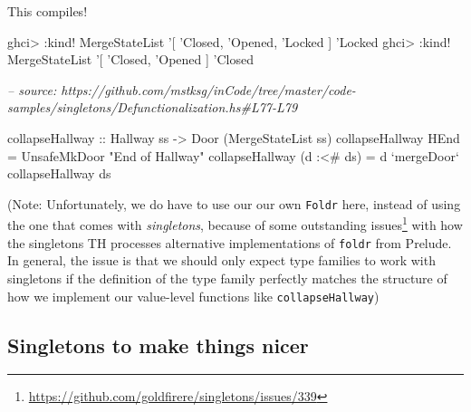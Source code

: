 \documentclass[]{article}
\newenvironment{Shaded}{}{}
\newcommand{\CommentTok}[1]{\textcolor[rgb]{0.38,0.63,0.69}{\textit{#1}}}
\newcommand{\DataTypeTok}[1]{\textcolor[rgb]{0.56,0.13,0.00}{#1}}
\newcommand{\FunctionTok}[1]{\textcolor[rgb]{0.02,0.16,0.49}{#1}}
\newcommand{\NormalTok}[1]{#1}
\newcommand{\OtherTok}[1]{\textcolor[rgb]{0.00,0.44,0.13}{#1}}
\newcommand{\StringTok}[1]{\textcolor[rgb]{0.25,0.44,0.63}{#1}}
\renewcommand{\href}[2]{#2\footnote{\url{#1}}}
\begin{document}
This compiles!

\begin{Shaded}
\begin{Highlighting}[]
\NormalTok{ghci}\FunctionTok{>} \FunctionTok{:}\NormalTok{kind}\FunctionTok{!} \DataTypeTok{MergeStateList}\NormalTok{ '[ '}\DataTypeTok{Closed}\NormalTok{, '}\DataTypeTok{Opened}\NormalTok{, '}\DataTypeTok{Locked}\NormalTok{ ]}
\NormalTok{'}\DataTypeTok{Locked}
\NormalTok{ghci}\FunctionTok{>} \FunctionTok{:}\NormalTok{kind}\FunctionTok{!} \DataTypeTok{MergeStateList}\NormalTok{ '[ '}\DataTypeTok{Closed}\NormalTok{, '}\DataTypeTok{Opened}\NormalTok{ ]}
\NormalTok{'}\DataTypeTok{Closed}
\end{Highlighting}
\end{Shaded}

\begin{Shaded}
\begin{Highlighting}[]
\CommentTok{-- source: https://github.com/mstksg/inCode/tree/master/code-samples/singletons/Defunctionalization.hs#L77-L79}

\OtherTok{collapseHallway ::} \DataTypeTok{Hallway}\NormalTok{ ss }\OtherTok{->} \DataTypeTok{Door}\NormalTok{ (}\DataTypeTok{MergeStateList}\NormalTok{ ss)}
\NormalTok{collapseHallway }\DataTypeTok{HEnd}       \FunctionTok{=} \DataTypeTok{UnsafeMkDoor} \StringTok{"End of Hallway"}
\NormalTok{collapseHallway (d }\FunctionTok{:<#}\NormalTok{ ds) }\FunctionTok{=}\NormalTok{ d }\OtherTok{`mergeDoor`}\NormalTok{ collapseHallway ds}
\end{Highlighting}
\end{Shaded}

(Note: Unfortunately, we do have to use our our own \texttt{Foldr} here, instead
of using the one that comes with \emph{singletons}, because of some
\href{https://github.com/goldfirere/singletons/issues/339}{outstanding issues}
with how the singletons TH processes alternative implementations of
\texttt{foldr} from Prelude. In general, the issue is that we should only expect
type families to work with singletons if the definition of the type family
perfectly matches the structure of how we implement our value-level functions
like \texttt{collapseHallway})

\hypertarget{singletons-to-make-things-nicer}{%
\subsection{Singletons to make things
nicer}\label{singletons-to-make-things-nicer}}
\end{document}
